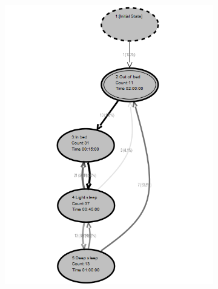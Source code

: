 \documentclass[12pt]{extarticle}
\begin{document}
\begin{figure}[H]
    \centering
    \begin{subfigure}[b]{0.45\textwidth}
        \includegraphics[width=\textwidth]{../Diagrams/sleeping.png}
        \caption{}
        \label{fig:sleeping}
    \end{subfigure}
    ~ %
    \begin{subfigure}[b]{0.45\textwidth}

\end{subfigure}
\end{figure}
\end{document}
